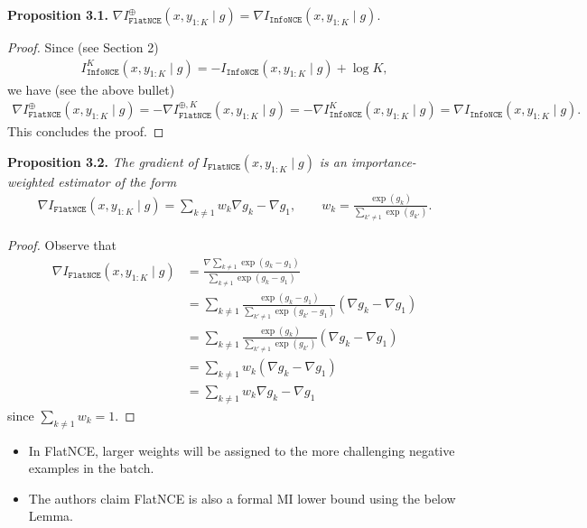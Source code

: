 \documentclass[10pt]{article}
\newcommand{\infonce}{\texttt{InfoNCE}}
\newcommand{\flatnce}{\texttt{FlatNCE}}
\begin{document}
\textbf{Proposition 3.1.} $\nabla I^\oplus_\flatnce(x,y_{1:K} \mid g) = \nabla I_\infonce(x,y_{1:K} \mid g)$.
\begin{proof}
Since (see Section 2)
\begin{align*}
I^K_\infonce(x,y_{1:K} \mid g) = -I_\infonce(x,y_{1:K} \mid g) + \log K,
\end{align*}
we have (see the above bullet)
\begin{align*}
\nabla I^\oplus_\flatnce(x,y_{1:K} \mid g) = - \nabla I^{\oplus,K}_\flatnce(x,y_{1:K} \mid g) = - \nabla I_\infonce^K(x,y_{1:K} \mid g) = \nabla I_\infonce(x,y_{1:K} \mid g).
\end{align*}
This concludes the proof.
\end{proof}

\textbf{Proposition 3.2.} \textit{The gradient of} $I_\flatnce(x,y_{1:K} \mid g)$ \textit{is an importance-weighted estimator of the form}
\begin{align*}
\nabla I_\flatnce(x,y_{1:K} \mid g) = \sum_{k \neq 1} w_k \nabla g_k - \nabla g_1, \qquad w_k = \frac{\exp(g_k)}{\sum_{k' \neq 1} \exp(g_{k'})}.
\end{align*}
\begin{proof}
Observe that
\begin{align*}
\nabla I_\flatnce(x,y_{1:K} \mid g) &= \frac{\nabla \sum_{k \neq 1} \exp(g_k - g_1)}{\sum_{k \neq 1} \exp(g_k - g_1)} \\
&= \sum_{k \neq 1} \frac{\exp(g_k - g_1)}{\sum_{k' \neq 1} \exp(g_{k'} - g_1)} (\nabla g_k - \nabla g_1) \\
&= \sum_{k \neq 1} \frac{\exp(g_k)}{\sum_{k' \neq 1} \exp(g_{k'})} (\nabla g_k - \nabla g_1) \\
&= \sum_{k \neq 1} w_k (\nabla g_k - \nabla g_1) \\
&= \sum_{k \neq 1} w_k \nabla g_k - \nabla g_1
\end{align*}
since $\sum_{k \neq 1} w_k = 1$.
\end{proof}

\newpage

\begin{itemize}
\item In FlatNCE, larger weights will be assigned to the more challenging negative examples in the batch.
\item The authors claim FlatNCE is also a formal MI lower bound using the below Lemma.
\end{itemize}
\end{document}
